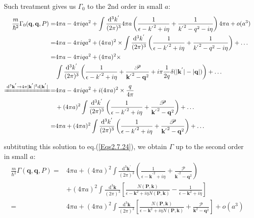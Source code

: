 Such treatment gives us $\Gamma_0$ to the 2nd order in small $a$:
\[ \begin{split} \frac{m}{\hbar^2} \Gamma_0(\mathbf{q},\mathbf{q},P) =& 4\pi a - 4\pi i q a^2 + \int \frac{\mathrm{d}^3 k^{'}}{(2\pi)^3} 4\pi a \left( \frac{1}{\epsilon-{k^{'}}^2 + i \eta} + \frac{1}{{k^{'}}^2-q^2-i \eta} \right)4\pi a + o(a^3)\\
=& 4\pi a - 4\pi i q a^2 + (4\pi a)^2 \times \int \frac{\mathrm{d}^3 k^{'}}{(2\pi)^3} \left( \frac{1}{\epsilon-{k^{'}}^2 + i \eta} + \frac{1}{{k^{'}}^2-q^2-i \eta} \right) + \ldots\\
=& 4\pi a - 4\pi i q a^2 + (4\pi a)^2 \times\\
&\int \frac{\mathrm{d}^3 k^{'}}{(2\pi)^3} \left( \frac{1}{\epsilon-{k^{'}}^2 + i \eta} + \frac{\mathscr{P}}{{\mathbf{k}^{'}}^2-\mathbf{q}^2} + i \pi \frac{1}{2q} \delta(|\mathbf{k}^{'}|-|\mathbf{q}|) \right) + \ldots\\
\xlongequal{\mathrm{d}^3 \mathbf{k}^{'} \rightarrow 4\pi |\mathbf{k}^{'}|^2 \mathrm{d} |\mathbf{k}^{'}|}
=&4\pi a - 4\pi i q a^2+ i (4\pi a)^2 \times \frac{q}{4\pi}
\\&+ (4\pi a)^2\int \frac{\mathrm{d}^3 k^{'}}{(2\pi)^3} \left( \frac{1}{\epsilon-{k^{'}}^2 + i \eta} + \frac{\mathscr{P}}{{\mathbf{k}^{'}}^2-\mathbf{q}^2} \right) + \ldots\\
=&4\pi a + (4\pi a)^2\int \frac{\mathrm{d}^3 k^{'}}{(2\pi)^3} \left( \frac{1}{\epsilon-{k^{'}}^2 + i \eta} + \frac{\mathscr{P}}{{\mathbf{k}^{'}}^2-\mathbf{q}^2} \right) + \ldots
\end{split} \]

subtituting this solution to eq.(\ref{Eqs2.7.24}), we obtain $\Gamma$ up to the second order in small $a$:
\begin{equation} \label{Eqs2.7.26} \begin{split}
\frac{m}{\hbar^2}\Gamma(\mathbf{q},\mathbf{q},P) =& 4\pi a + (4\pi a)^2 \int \frac{\mathrm{d}^3 \mathbf{k}^{'}}{(2\pi)^3} \left( \frac{1}{\epsilon-{\mathbf{k}^{'}}^2 + i \eta} + \frac{\mathscr{P}}{{\mathbf{k}^{'}}^2-\mathbf{q}^2} \right)\\
&+ (4\pi a)^2 \int \frac{\mathrm{d}^3 \mathbf{k}}{(2\pi)^3} \left[ \frac{N(\mathbf{P},\mathbf{k})}{\epsilon-\mathbf{k}^2+i \eta N(\mathbf{P},\mathbf{k})} - \frac{1}{\epsilon-{\mathbf{k}}^2 + i \eta} \right]\\
=& 4\pi a + (4\pi a)^2 \int \frac{\mathrm{d}^3 \mathbf{k}}{(2\pi)^3}\left[ \frac{N(\mathbf{P},\mathbf{k})}{\epsilon-\mathbf{k}^2+i \eta N(\mathbf{P},\mathbf{k})} + \frac{\mathscr{P}}{{\mathbf{k}}^2-\mathbf{q}^2} \right] + o(a^3)
\end{split} \end{equation}

